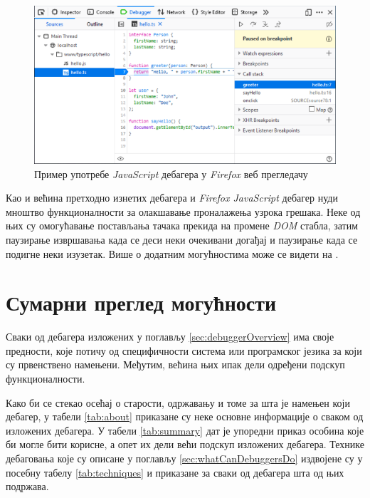 \documentclass[a4paper]{article}
\begin{document}
\begin{figure}
    \begin{center}
        \includegraphics[width=\textwidth]{slike/javascript_debager.png}
    \end{center}
    \caption{Пример употребе {\em JavaScript} дебагера у {\em Firefox} веб прегледачу}
    \label{fig:jsDebugger}
\end{figure}

Као и већина претходно изнетих дебагера и {\em 
Firefox JavaScript} дебагер нуди мноштво функционалности за олакшавање
проналажења узрока грешака. Неке од њих су омогућавање постављања 
тачака прекида на промене {\em DOM} стабла, затим паузирање извршавања
када се деси неки очекивани догађај и паузирање када се подигне неки
изузетак. Више о додатним могућностима може се видети на \cite{firefoxDebugger}.

\section{Сумарни преглед могућности}

Сваки од дебагера изложених у поглављу \ref{sec:debuggerOverview} има
своје предности, које потичу од специфичности система или програмског језика
за који су првенствено намењени. Међутим, већина њих ипак дели одређени подскуп
функционалности.

Како би се стекао осећај о старости, одржавању и томе за шта је намењен који дебагер,
у табели \ref{tab:about} приказане су неке основне информације о сваком од изложених дебагера.
У табели \ref{tab:summary} дат је упоредни приказ особина које би могле бити корисне,
а опет их дели већи подскуп изложених дебагера. Технике дебаговања које
су описане у поглављу \ref{sec:whatCanDebuggersDo} издвојене су у посебну табелу
\ref{tab:techniques} и приказане за сваки од дебагера шта од њих подржава.
\end{document}
